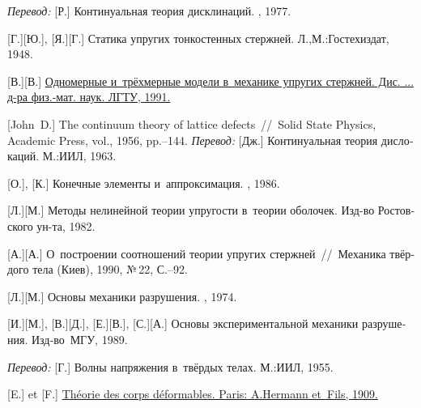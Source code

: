 \begin{thebibliography}{123}
\begin{otherlanguage}{russian}
\emph{Перевод:} [Р.] Континуальная теория дисклинаций. \mirpublisher, 1977. 

[Г.][Ю.], [Я.][Г.] Статика упругих тонкостенных стержней. Л.,\:М.:\;Гостехиздат, 1948. 

[В.][В.] \href{https://www.researchgate.net/publication/320895320_Odnomernye_i_trehmernye_modeli_v_mehanike_uprugih_sterznej}{Одномерные и~трёхмерные модели в~механике упругих стержней. Дис. ... д\hbox{-}ра физ.\hbox{-}мат. наук. ЛГТУ, 1991.} 

[John~D.] The continuum theory of lattice defects~//~Solid State Physics, Academic Press, vol., 1956, pp.\hbox{--}144.
\emph{Перевод:} [Дж.] Континуальная теория дислокаций. М.:\;ИИЛ, 1963. 

[О.], [К.] Конечные элементы и~аппроксимация. \mirpublisher, 1986. 

[Л.][М.] Методы нелинейной теории упругости в~теории оболочек.
Изд\hbox{-}во Ростовского ун\hbox{-}та,
1982. 

[А.][А.] О~построении соотношений теории упругих стержней~//~Механика твёрдого тела (Киев), 1990, №\,22, С.\hbox{--}92.

[Л.][М.] Основы механики разрушения. \naukapublisher, 1974. 

[И.][М.], [В.][Д.], [Е.][В.], [С.][А.]
Основы экспериментальной механики разрушения. Изд\hbox{-}во~МГУ, 1989. 

\emph{Перевод:} [Г.] Волны напряжения в~твёрдых телах. М.:\;ИИЛ, 1955. 

[E.] et [F.] \href{https://jscholarship.library.jhu.edu/bitstream/handle/1774.2/34209/31151000327233.pdf}{Théorie des corps déformables. Paris: A.\:Hermann et~Fils, 1909.} 


\end{otherlanguage}
\end{thebibliography}
